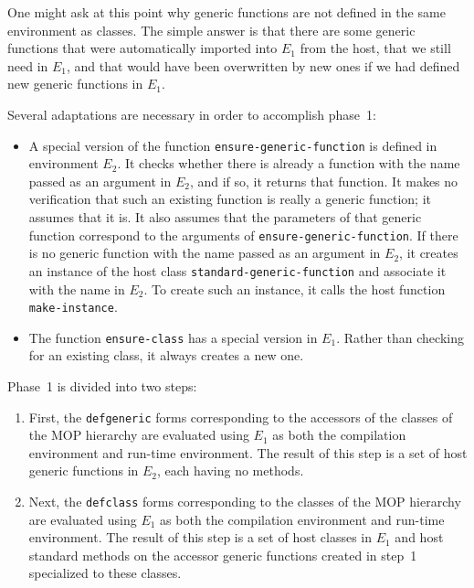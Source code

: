 One might ask at this point why generic functions are not defined in
the same environment as classes.  The simple answer is that there are
some generic functions that were automatically imported into $E_1$
from the host, that we still need in $E_1$, and that would have been
overwritten by new ones if we had defined new generic functions in
$E_1$.

Several adaptations are necessary in order to accomplish phase~1:

\begin{itemize}
\item A special version of the function
  \texttt{ensure-generic-function} is defined in environment $E_2$.
  It checks whether there is already a function with the name passed
  as an argument in $E_2$, and if so, it returns that function.  It
  makes no verification that such an existing function is really a
  generic function; it assumes that it is.  It also assumes that the
  parameters of that generic function correspond to the arguments of
  \texttt{ensure-generic-function}.  If there is no generic function
  with the name passed as an argument in $E_2$, it creates an instance
  of the host class \texttt{standard-generic-function} and associate
  it with the name in $E_2$.  To create such an instance, it calls the
  host function \texttt{make-instance}.
\item The function \texttt{ensure-class} has a special version in
  $E_1$.  Rather than checking for an existing class, it always
  creates a new one.
\end{itemize}

Phase~1 is divided into two steps:

\begin{enumerate}
\item First, the \texttt{defgeneric} forms corresponding to the
  accessors of the classes of the MOP hierarchy are evaluated using
  $E_1$ as both the compilation environment and run-time environment.
  The result of this step is a set of host generic functions in $E_2$,
  each having no methods.
\item Next, the \texttt{defclass} forms corresponding to the classes
  of the MOP hierarchy are evaluated using $E_1$ as both the
  compilation environment and run-time environment.  The result of
  this step is a set of host classes in $E_1$ and host standard
  methods on the accessor generic functions created in step~1
  specialized to these classes.
\end{enumerate}

